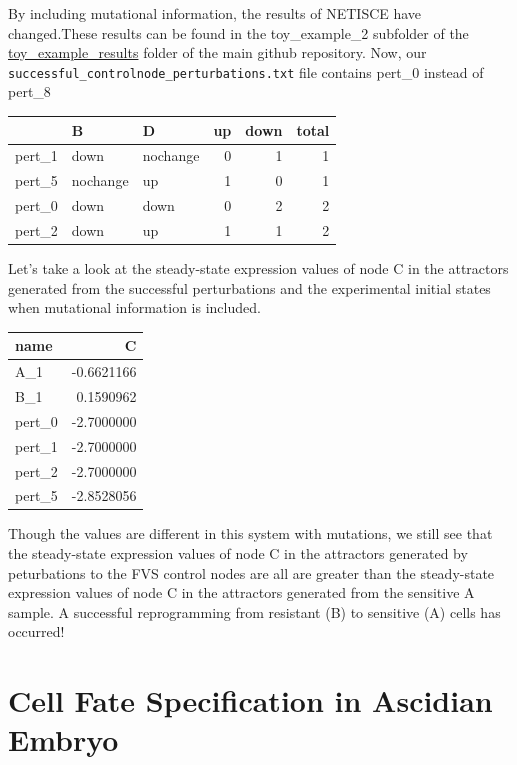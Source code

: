 \documentclass[
]{book}
\theoremstyle{definition}
\theoremstyle{definition}
\theoremstyle{definition}
\theoremstyle{definition}
\theoremstyle{remark}
\begin{document}
By including mutational information, the results of NETISCE have changed.These results can be found in the toy\_example\_2 subfolder of the \href{https://github.com/VeraLiconaResearchGroup/Netisce/tree/main/toy_example_results}{toy\_example\_results} folder of the main github repository.
Now, our \texttt{successful\_controlnode\_perturbations.txt} file contains pert\_0 instead of pert\_8

\begin{tabular}{l|l|l|r|r|r}
\hline
  & B & D & up & down & total\\
\hline
pert\_1 & down & nochange & 0 & 1 & 1\\
\hline
pert\_5 & nochange & up & 1 & 0 & 1\\
\hline
pert\_0 & down & down & 0 & 2 & 2\\
\hline
pert\_2 & down & up & 1 & 1 & 2\\
\hline
\end{tabular}

Let's take a look at the steady-state expression values of node C in the attractors generated from the successful perturbations and the experimental initial states when mutational information is included.

\begin{tabular}{l|r}
\hline
name & C\\
\hline
A\_1 & -0.6621166\\
\hline
B\_1 & 0.1590962\\
\hline
pert\_0 & -2.7000000\\
\hline
pert\_1 & -2.7000000\\
\hline
pert\_2 & -2.7000000\\
\hline
pert\_5 & -2.8528056\\
\hline
\end{tabular}

Though the values are different in this system with mutations, we still see that the steady-state expression values of node C in the attractors generated by peturbations to the FVS control nodes are all are greater than the steady-state expression values of node C in the attractors generated from the sensitive A sample. A successful reprogramming from resistant (B) to sensitive (A) cells has occurred!

\hypertarget{cell-fate-specification-in-ascidian-embryo}{%
\chapter{Cell Fate Specification in Ascidian Embryo}\label{cell-fate-specification-in-ascidian-embryo}}
\end{document}
